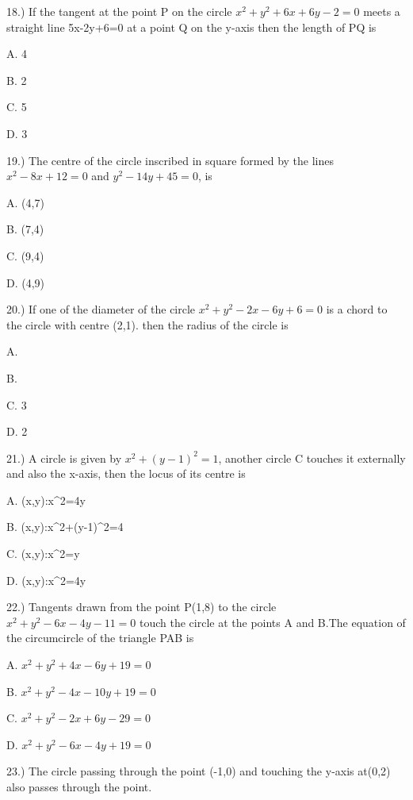 \documentclass{article}
\begin{document}
\vspace{5mm}
18.) If the tangent at the point P on the circle $x^2+y^2+6x+6y-2=0$ meets a straight line 5x-2y+6=0 at a point Q on the y-axis then the length of PQ is

\choice  A. 4

\choice  B. 2

\choice  C. 5

\choice  D.  3

\vspace{5mm}
19.) The centre of the circle inscribed in square formed by the lines $x^2-8x+12=0$ and $y^2-14y+45=0$, is

\choice  A. (4,7)

\choice  B. (7,4)

\choice  C. (9,4)

\choice  D. (4,9)

\vspace{5mm}
20.) If one of the diameter of the circle $x^2+y^2-2x-6y+6=0$ is a chord to the circle with centre (2,1). then the radius of the circle is 

\choice  A. 

\choice  B. 

\choice  C. 3

\choice  D.  2

\vspace{5mm}
21.) A circle is given by $x^2+(y-1)^2=1$, another circle C touches it externally and also the x-axis, then the locus of its centre is

\choice  A. {(x,y):x^2=4y} 

\choice  B. {(x,y):x^2+(y-1)^2=4} 

\choice  C. {(x,y):x^2=y} 

\choice  D.  {(x,y):x^2=4y} 

\vspace{5mm}
22.) Tangents drawn from the point P(1,8) to the circle $x^2+y^2-6x-4y-11=0$ touch the circle at the points A and B.The equation of the circumcircle of the triangle PAB is

\choice  A. $x^2+y^2+4x-6y+19=0$

\choice  B. $x^2+y^2-4x-10y+19=0$

\choice  C. $x^2+y^2-2x+6y-29=0$

\choice  D.  $x^2+y^2-6x-4y+19=0$

\vspace{5mm}
23.) The circle passing through the point (-1,0) and touching the y-axis at(0,2) also passes through the point.
\end{document}
